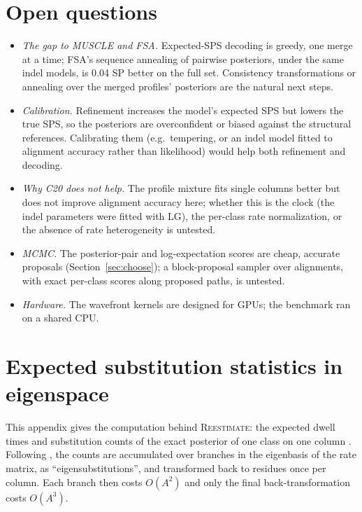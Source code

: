 \documentclass[11pt]{article}
\begin{document}
\section{Open questions}
\begin{itemize}
\item \emph{The gap to MUSCLE and FSA.} Expected-SPS decoding is greedy, one
  merge at a time; FSA's sequence annealing of pairwise posteriors, under the
  same indel models, is 0.04 SP better on the full set. Consistency
  transformations or annealing over the merged profiles' posteriors are the
  natural next steps.
\item \emph{Calibration.} Refinement increases the model's expected SPS but
  lowers the true SPS, so the posteriors are overconfident or biased against
  the structural references. Calibrating them (e.g.\ tempering, or an indel
  model fitted to alignment accuracy rather than likelihood) would help both
  refinement and decoding.
\item \emph{Why C20 does not help.} The profile mixture fits single columns
  better but does not improve alignment accuracy here; whether this is the
  clock (the indel parameters were fitted with LG), the per-class rate
  normalization, or the absence of rate heterogeneity is untested.
\item \emph{MCMC.} The posterior-pair and log-expectation scores are cheap,
  accurate proposals (Section~\ref{sec:choose}); a block-proposal sampler over
  alignments, with exact per-class scores along proposed paths, is untested.
\item \emph{Hardware.} The wavefront kernels are designed for GPUs; the
  benchmark ran on a shared CPU.
\end{itemize}

\appendix
\section{Expected substitution statistics in eigenspace}
\label{app:hr}

This appendix gives the computation behind \textsc{Reestimate}: the expected
dwell times and substitution counts of the exact posterior of one class on one
column \citep{HolmesRubin2002,HobolthJensen2005}. Following
\citet{HolmesRubin2002}, the counts are accumulated over
branches in the eigenbasis of the rate matrix, as ``eigensubstitutions'', and
transformed back to residues once per column. Each branch then costs $O(A^2)$
and only the final back-transformation costs $O(A^3)$.
\end{document}
